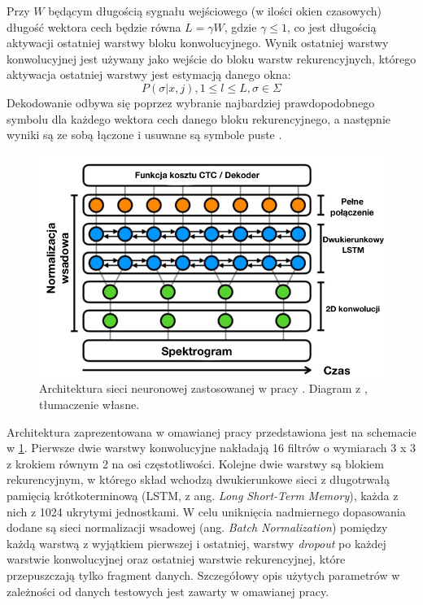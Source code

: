 \documentclass[12pt,a4paper,twoside]{mwart}
\begin{document}
Przy $W$ będącym długością sygnału wejściowego (w ilości okien czasowych) długość wektora cech będzie równa $L = \gamma W$, gdzie $\gamma \leqslant 1$, co jest długością aktywacji ostatniej warstwy bloku konwolucyjnego. Wynik ostatniej warstwy konwolucyjnej jest używany jako wejście do bloku warstw rekurencyjnych, którego aktywacja ostatniej warstwy jest estymacją danego okna:
\begin{equation}
  P(\sigma | x, j), 1 \leqslant l \leqslant L, \sigma \in \Sigma 
\end{equation}
Dekodowanie odbywa się poprzez wybranie najbardziej prawdopodobnego symbolu dla każdego wektora cech danego bloku rekurencyjnego, a następnie wyniki są ze sobą łączone i usuwane są symbole puste \cite[2-5]{Transcription:Pertus:NeuralNetwork}.


\begin{figure}[ht]
  \begin{center}
    \includegraphics[scale=0.5]{images/holisticNetworkArchitecture.jpg}
    \caption{Architektura sieci neuronowej zastosowanej w pracy  \cite{Transcription:Pertus:NeuralNetwork}. Diagram z \cite[5]{Transcription:Pertus:NeuralNetwork}, tłumaczenie własne.}
    \label{fig:holisticNetworkArchitecture}
  \end{center}
\end{figure}

Architektura zaprezentowana w omawianej pracy przedstawiona jest na schemacie w \ref{fig:holisticNetworkArchitecture}. Pierwsze dwie warstwy konwolucyjne nakładają 16 filtrów o wymiarach 3 x 3 z krokiem równym 2 na osi częstotliwości. Kolejne dwie warstwy są blokiem rekurencyjnym, w którego skład wchodzą dwukierunkowe sieci z długotrwałą pamięcią krótkoterminową (LSTM, z ang. \textit{Long Short-Term Memory}), każda z nich z 1024 ukrytymi jednostkami. W celu uniknięcia nadmiernego dopasowania dodane są sieci normalizacji wsadowej (ang. \textit{Batch Normalization}) pomiędzy każdą warstwą z wyjątkiem pierwszej i ostatniej, warstwy \textit{dropout} po każdej warstwie konwolucyjnej oraz ostatniej warstwie rekurencyjnej, które przepuszczają tylko fragment danych. Szczegółowy opis użytych parametrów w zależności od danych testowych jest zawarty w omawianej pracy.
\end{document}
